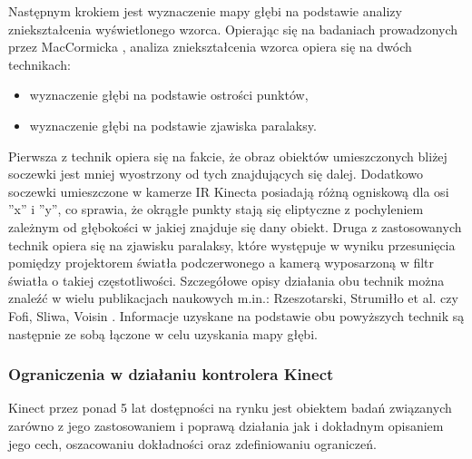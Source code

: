 	Następnym krokiem jest wyznaczenie mapy głębi na podstawie analizy zniekształcenia wyświetlonego wzorca. Opierając się na badaniach prowadzonych przez MacCormicka \cite{MacCormick2011}, analiza zniekształcenia wzorca opiera się na dwóch technikach:
		
	\begin{itemize}
		\item wyznaczenie głębi na podstawie ostrości punktów,
		\item wyznaczenie głębi na podstawie zjawiska paralaksy.
	\end{itemize}
		
	Pierwsza z technik opiera się na fakcie, że obraz obiektów umieszczonych bliżej soczewki jest mniej wyostrzony od tych znajdujących się dalej. Dodatkowo soczewki umieszczone w kamerze IR Kinecta posiadają różną ogniskową dla osi ''x'' i ''y'', co sprawia, że okrągłe punkty stają się eliptyczne z pochyleniem zależnym od głębokości w jakiej znajduje się dany obiekt. Druga z zastosowanych technik opiera się na zjawisku paralaksy, które występuje w wyniku przesunięcia pomiędzy projektorem światła podczerwonego a kamerą wyposarzoną w filtr światła o takiej częstotliwości. Szczegółowe opisy działania obu technik można znaleźć w wielu publikacjach naukowych m.in.: Rzeszotarski, Strumiłło et al. \cite{Rzeszotarski2006} czy Fofi, Sliwa, Voisin \cite{Fofi2004}. Informacje uzyskane na podstawie obu powyższych technik są następnie ze sobą łączone w celu uzyskania mapy głębi.
		
	\subsubsection*{Ograniczenia w działaniu kontrolera Kinect}\label{ssec:characteristics:kinect:limitation}
		
	Kinect przez ponad 5 lat dostępności na rynku jest obiektem badań związanych zarówno z jego zastosowaniem i poprawą działania jak i dokładnym opisaniem jego cech, oszacowaniu dokładności oraz zdefiniowaniu ograniczeń. 
		
